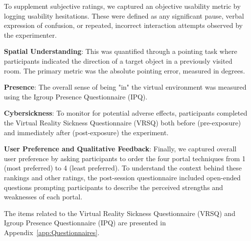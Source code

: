 To supplement subjective ratings, we captured an objective usability metric by logging usability hesitations. These were defined as any significant pause, verbal expression of confusion, or repeated, incorrect interaction attempts observed by the experimenter.

\textbf{Spatial Understanding}: This was quantified through a pointing task where participants indicated the direction of a target object in a previously visited room. The primary metric was the absolute pointing error, measured in degrees.

\textbf{Presence}: The overall sense of being "in" the virtual environment was measured using the Igroup Presence Questionnaire (IPQ).

\textbf{Cybersickness}: To monitor for potential adverse effects, participants completed the Virtual Reality Sickness Questionnaire (VRSQ) both before (pre-exposure) and immediately after (post-exposure) the experiment.

\textbf{User Preference and Qualitative Feedback}: Finally, we captured overall user preference by asking participants to order the four portal techniques from 1 (most preferred) to 4 (least preferred). To understand the context behind these rankings and other ratings, the post-session questionnaire included open-ended questions prompting participants to describe the perceived strengths and weaknesses of each portal.

The items related to the Virtual Reality Sickness Questionnaire (VRSQ) and Igroup Presence Questionnaire (IPQ) are presented in Appendix~\ref{app:Questionnaires}.





